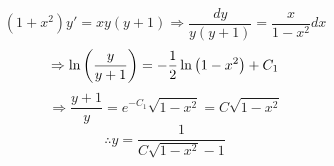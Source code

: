 \item

\[
	\left( 1 + x^2 \right) y' = xy(y + 1)
	\Rightarrow \frac{dy}{y (y + 1)} = \frac{x}{1 - x^2} dx
\]
\[
	\Rightarrow \ln \left( \frac{y}{y + 1} \right) = - \frac{1}{2} \ln \left( 1 - x^2 \right) + C_1
\]
\[
	\Rightarrow \frac{y + 1}{y} = e^{-C_1} \sqrt{1 - x^2} = C \sqrt{1 - x^2}
\]
\[
	\therefore y = \frac{1}{C\sqrt{1 - x^2} - 1}
\]